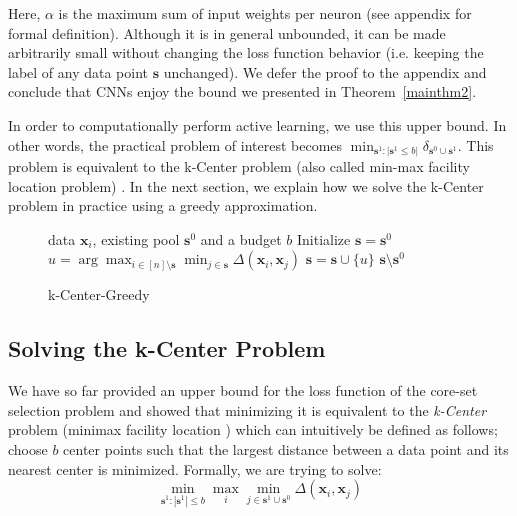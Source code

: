 \documentclass{article} %
\makeatletter
\newcommand*{\ie}{i.e.\@\xspace}
\makeatother
\begin{document}
Here, $\alpha$ is the maximum sum of  input weights per neuron (see appendix for formal definition). Although it is in
general unbounded, it can be made arbitrarily small without changing the loss function behavior (\ie keeping the label
of any data point $\mathbf{s}$ unchanged). We defer the proof to the appendix and conclude that CNNs enjoy the bound we
presented in Theorem~\ref{mainthm2}.

In order to computationally perform active learning, we use this upper bound. In other words, the practical problem of interest becomes $\min_{\mathbf{s}^1:|\mathbf{s}^1 \leq b|} \delta_{\mathbf{s}^0\cup \mathbf{s}^1}$. This problem is equivalent to the k-Center problem (also called min-max facility location problem) \citep{facility}. In the next section, we explain how we solve the k-Center problem in practice using a greedy approximation.{\par}

\begin{figure}
\begin{minipage}{0.44\textwidth}
\vspace{-8mm}
   \begin{algorithm}[H] 
   \caption{k-Center-Greedy} 
   \label{alg:greedy} 
   \begin{algorithmic} 
    data $\mathbf{x}_i$, existing pool $\mathbf{s}^0$ and a budget $b$ 
   \STATE Initialize $\mathbf{s}=\mathbf{s}^0$ \REPEAT \STATE $u=\arg\max_{i \in [n] \setminus \mathbf{s}} \min_{j \in \mathbf{s}} \Delta(\mathbf{x}_i, \mathbf{x}_j)$ \STATE $\mathbf{s} = \mathbf{s} \cup \{u\}$ 
    $\mathbf{s} \setminus \mathbf{s}^0$ \end{algorithmic}
\end{algorithm} 
\vspace{-10mm}
\end{minipage} 
\end{figure}  

\subsection{Solving the k-Center Problem} 
\label{sec:alg} 
We have so far provided an upper bound for the loss function of the core-set selection problem and showed that minimizing it is equivalent to the \emph{k-Center} problem (minimax facility location \citep{facility}) which can intuitively be defined as follows; choose $b$ center points such that the  largest distance between a data point and its nearest center is minimized. Formally, we are trying to solve: 
\begin{equation}
    \min_{\mathbf{s}^1:|\mathbf{s}^1| \leq b} \max_i \min_{j \in \mathbf{s}^1 \cup \mathbf{s}^0} \Delta(\mathbf{x}_i,\mathbf{x}_j)
\end{equation}
\end{document}
